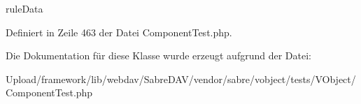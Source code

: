 rule\+Data 

Definiert in Zeile 463 der Datei Component\+Test.\+php.



Die Dokumentation für diese Klasse wurde erzeugt aufgrund der Datei\+:\begin{DoxyCompactItemize}
\item 
Upload/framework/lib/webdav/\+Sabre\+D\+A\+V/vendor/sabre/vobject/tests/\+V\+Object/Component\+Test.\+php\end{DoxyCompactItemize}
